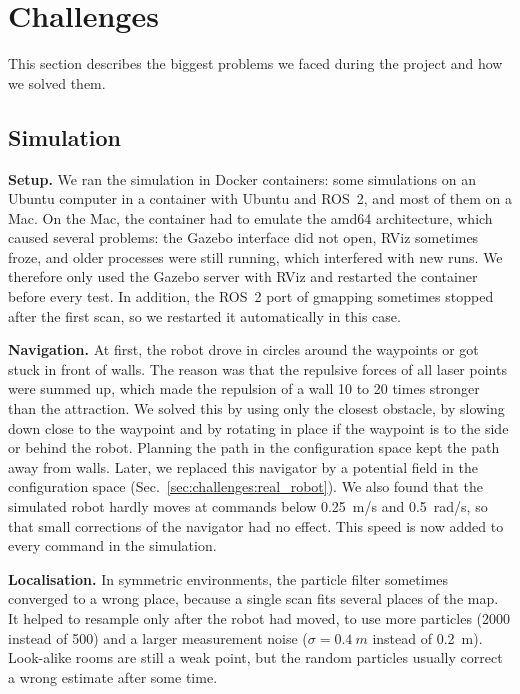 \documentclass[../report.tex]{subfiles}
\begin{document}
    \section{Challenges}
    \label{sec:challenges}

    This section describes the biggest problems we faced during the project and how we solved them.

    \subsection{Simulation}
    \label{sec:challenges:simulation}


    \textbf{Setup.}
    We ran the simulation in Docker containers: some simulations on an Ubuntu computer in a container with Ubuntu and ROS~2, and most of them on a Mac.
    On the Mac, the container had to emulate the amd64 architecture, which caused several problems: the Gazebo interface did not open, RViz sometimes froze, and older processes were still running, which interfered with new runs.
    We therefore only used the Gazebo server with RViz and restarted the container before every test.
    In addition, the ROS~2 port of gmapping sometimes stopped after the first scan, so we restarted it automatically in this case.

    \textbf{Navigation.}
    At first, the robot drove in circles around the waypoints or got stuck in front of walls.
    The reason was that the repulsive forces of all laser points were summed up, which made the repulsion of a wall 10 to 20 times stronger than the attraction.
    We solved this by using only the closest obstacle, by slowing down close to the waypoint and by rotating in place if the waypoint is to the side or behind the robot.
    Planning the path in the configuration space kept the path away from walls.
    Later, we replaced this navigator by a potential field in the configuration space (Sec.~\ref{sec:challenges:real_robot}).
    We also found that the simulated robot hardly moves at commands below \SI{0.25}{m/s} and \SI{0.5}{rad/s}, so that small corrections of the navigator had no effect. This speed is now added to every command in the simulation.

    \textbf{Localisation.}
    In symmetric environments, the particle filter sometimes converged to a wrong place, because a single scan fits several places of the map.
    It helped to resample only after the robot had moved, to use more particles (2000 instead of 500) and a larger measurement noise ($\sigma = \SI{0.4}{m}$ instead of \SI{0.2}{m}).
    Look-alike rooms are still a weak point, but the random particles usually correct a wrong estimate after some time.
\end{document}
